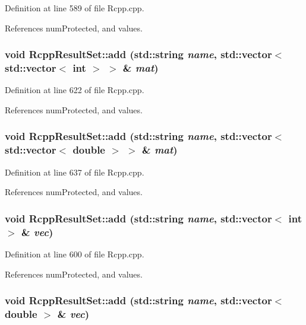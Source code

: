 Definition at line 589 of file Rcpp.cpp.

References numProtected, and values.\hypertarget{classRcppResultSet_ab51f30f4bd5f3c6153221a3bd7bb7e24}{
\subsubsection[{add}]{\setlength{\rightskip}{0pt plus 5cm}void RcppResultSet::add (std::string {\em name}, \/  std::vector$<$ std::vector$<$ int $>$ $>$ \& {\em mat})}}
\label{classRcppResultSet_ab51f30f4bd5f3c6153221a3bd7bb7e24}


Definition at line 622 of file Rcpp.cpp.

References numProtected, and values.\hypertarget{classRcppResultSet_ab10cd8503c12708e27068b92a83e4047}{
\subsubsection[{add}]{\setlength{\rightskip}{0pt plus 5cm}void RcppResultSet::add (std::string {\em name}, \/  std::vector$<$ std::vector$<$ double $>$ $>$ \& {\em mat})}}
\label{classRcppResultSet_ab10cd8503c12708e27068b92a83e4047}


Definition at line 637 of file Rcpp.cpp.

References numProtected, and values.\hypertarget{classRcppResultSet_a23fa5be81281adcf3014749094816522}{
\subsubsection[{add}]{\setlength{\rightskip}{0pt plus 5cm}void RcppResultSet::add (std::string {\em name}, \/  std::vector$<$ int $>$ \& {\em vec})}}
\label{classRcppResultSet_a23fa5be81281adcf3014749094816522}


Definition at line 600 of file Rcpp.cpp.

References numProtected, and values.\hypertarget{classRcppResultSet_a2b4575ca5ccc390bc5437b1be4718ca6}{
\subsubsection[{add}]{\setlength{\rightskip}{0pt plus 5cm}void RcppResultSet::add (std::string {\em name}, \/  std::vector$<$ double $>$ \& {\em vec})}}
\label{classRcppResultSet_a2b4575ca5ccc390bc5437b1be4718ca6}


